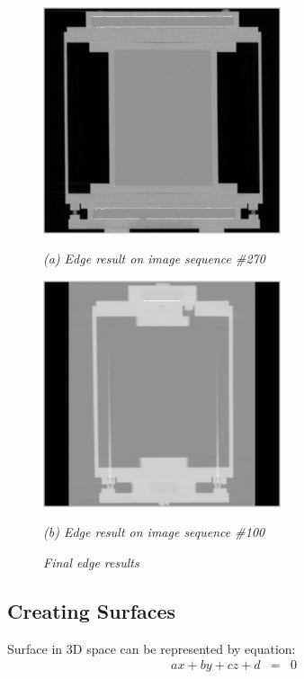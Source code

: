 \begin{figure}[htb]
  \begin{minipage}[t]{2.75in}
    \centering
    \centerline{\mbox{\includegraphics[width=2.75in]{data_extraction/images/sample/20121017_270/Coronal/result.eps}}}
    \centerline{\emph{(a) Edge result on image sequence \#270}}
  \end{minipage}
  \begin{minipage}[t]{2.75in}
    \centering
    \centerline{\mbox{\includegraphics[width=2.75in]{data_extraction/images/sample/20121017_100/Coronal/result_canny_[0.001,0.002].eps}}}
    \centerline{\emph{(b) Edge result on image sequence \#100}}
  \end{minipage}
  \caption{\emph{Final edge results}}
  \label{fig:coronal_edge_final_result}
\end{figure}


\subsection{Creating Surfaces}

Surface in 3D space can be represented by equation:
\begin{eqnarray}
ax + by + cz + d & = & 0 \label{eq:plane}
\end{eqnarray}

